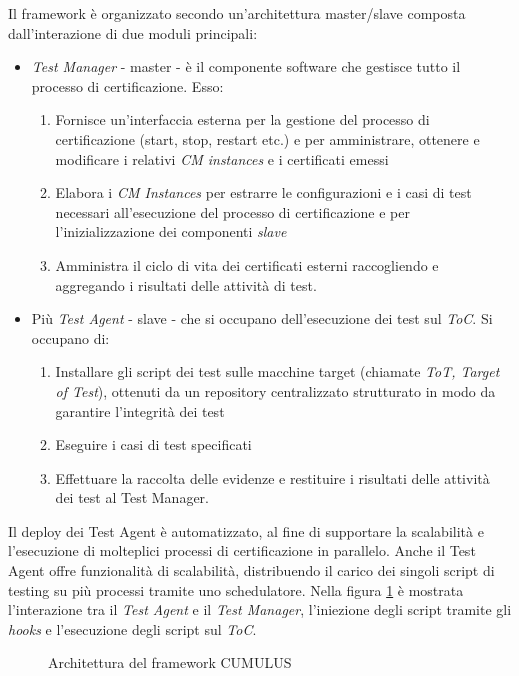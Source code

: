 \documentclass[../main.tex]{subfiles}
\begin{document}
Il framework è organizzato secondo un'architettura master/slave composta dall'interazione di due moduli principali\cite{Cloud1}:
\begin{itemize}
\item \textit{Test Manager} - master - è il componente software che gestisce tutto il processo di certificazione. Esso:
\begin{enumerate}
\item Fornisce un'interfaccia esterna per la gestione del processo di certificazione (start, stop, restart etc.) e per amministrare, ottenere e modificare i relativi \textit{CM instances} e i certificati emessi
\item Elabora i \textit{CM Instances} per estrarre le configurazioni e i casi di test necessari all'esecuzione del processo di certificazione e per l'inizializzazione dei componenti \textit{slave}
\item Amministra il ciclo di vita dei certificati esterni raccogliendo e aggregando i risultati delle attività di test.
\end{enumerate}
\item Più \textit{Test Agent} - slave - che si occupano dell'esecuzione dei test sul \textit{ToC}. Si occupano di:
\begin{enumerate}
\item Installare gli script dei test sulle macchine target (chiamate \textit{ToT, Target of Test}), ottenuti da un repository centralizzato strutturato in modo da garantire l'integrità dei test
\item Eseguire i casi di test specificati
\item Effettuare la raccolta delle evidenze e restituire i risultati delle attività dei test al Test Manager.
\end{enumerate}
\end{itemize}
Il deploy dei Test Agent è automatizzato, al fine di supportare la scalabilità e l'esecuzione di molteplici processi di certificazione in parallelo. Anche il Test Agent offre funzionalità di scalabilità, distribuendo il carico dei singoli script di testing su più processi tramite uno schedulatore. 
Nella figura \ref{fig:InterazTaTm} è mostrata l'interazione tra il \textit{Test Agent} e il \textit{Test Manager}, l'iniezione degli script tramite gli \textit{hooks} e l'esecuzione degli script sul \textit{ToC}.

\begin{figure}[H]
\centering
{}
\caption{Architettura del framework CUMULUS \cite{Cloud1}}\label{fig:InterazTaTm}
\end{figure}
\end{document}
